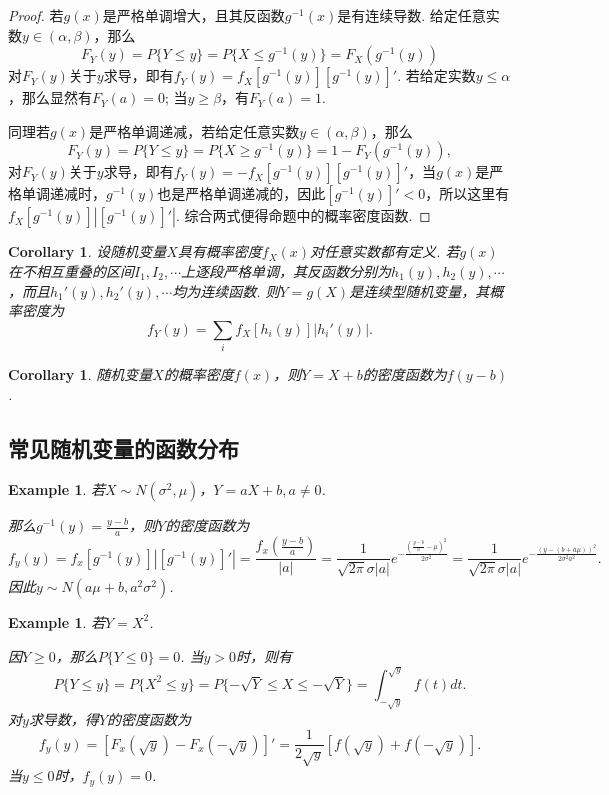 \documentclass{article}
\newtheorem{corollary}[theorem]{Corollary}
\newtheorem{example}[theorem]{Example}
\begin{document}
\begin{proof}
若$g(x)$是严格单调增大，且其反函数$g^{-1}(x)$是有连续导数. 给定任意实数$y \in (\alpha,\beta)$，那么
$$
F_Y(y) = P\{Y \leq y \} = P\{X \leq g^{-1}(y)\} = F_X(g^{-1}(y))
$$
对$F_Y(y)$关于$y$求导，即有$f_Y(y) = f_X\left[ g^{-1}(y) \right]\left[g^{-1}(y)\right]'$. 若给定实数$y \leq \alpha$，那么显然有$F_Y(a) = 0$; 当$y \geq \beta$，有$F_Y(a) = 1$.

同理若$g(x)$是严格单调递减，若给定任意实数$y \in (\alpha,\beta)$，那么
$$
F_Y(y) = P\{Y \leq y \} = P\{X \geq g^{-1}(y)\} = 1-F_Y(g^{-1}(y)), 
$$
对$F_Y(y)$关于$y$求导，即有$f_Y(y) = -f_X\left[ g^{-1}(y) \right]\left[g^{-1}(y)\right]'$，当$g(x)$是严格单调递减时，$g^{-1}(y)$也是严格单调递减的，因此$\left[g^{-1}(y)\right]' < 0$，所以这里有$f_X\left[ g^{-1}(y) \right]|\left[g^{-1}(y)\right]'|$. 综合两式便得命题中的概率密度函数. 
\end{proof}

\begin{corollary}
\rm 设随机变量$X$具有概率密度$f_X(x)$对任意实数都有定义. 若$g(x)$在不相互重叠的区间$I_1,I_2,\cdots$上逐段严格单调，其反函数分别为$h_1(y),h_2(y),\cdots$，而且$h_1'(y),h_2'(y),\cdots$均为连续函数. 则$Y=g(X)$是连续型随机变量，其概率密度为
$$
f_Y(y) = \sum\limits_{i}f_X\left[h_i(y)\right]|h_i'(y)|. 
$$
\end{corollary}

\begin{corollary}
\rm 随机变量$X$的概率密度$f(x)$，则$Y=X+b$的密度函数为$f(y-b)$.
\end{corollary}

\subsection{常见随机变量的函数分布}

\begin{example}
\rm 若$X \sim N(\sigma^2,\mu)$，$Y=aX+b,a\neq 0$. 

那么$g^{-1}(y) = \frac{y-b}{a}$，则$Y$的密度函数为
$$
f_y(y) = f_x[g^{-1}(y)]|[g^{-1}(y)]'|= \frac{f_x(\frac{y-b}{a})}{|a|} = \frac{1}{\sqrt{2\pi}\sigma|a|}e^{-\frac{(\frac{y-b}{a}-\mu)^2}{2\sigma^2}} = \frac{1}{\sqrt{2\pi}\sigma|a|}e^{-\frac{(y-(b+a\mu))^2}{2\sigma^2a^2}}.
$$
因此$y \sim N(a\mu+b,a^2\sigma^2)$.
\end{example}

\begin{example}
\rm 若$Y=X^2$.

因$Y \geq 0$，那么$P\{Y \leq 0\} = 0$. 当$y > 0$时，则有
$$
P\{Y \leq y\} = P\{X^2 \leq y\} = P\{-\sqrt{Y} \leq X \leq -\sqrt{Y}\} = \int_{-\sqrt{y}}^{\sqrt{y}} f(t)dt.
$$
对$y$求导数，得$Y$的密度函数为
$$
f_y(y) = [F_x(\sqrt{y})-F_x(-\sqrt{y})]' = \frac{1}{2\sqrt{y}}[f(\sqrt{y}) + f(-\sqrt{y})].
$$
当$y \leq 0$时，$f_y(y)=0$. 
\end{example}
\end{document}
